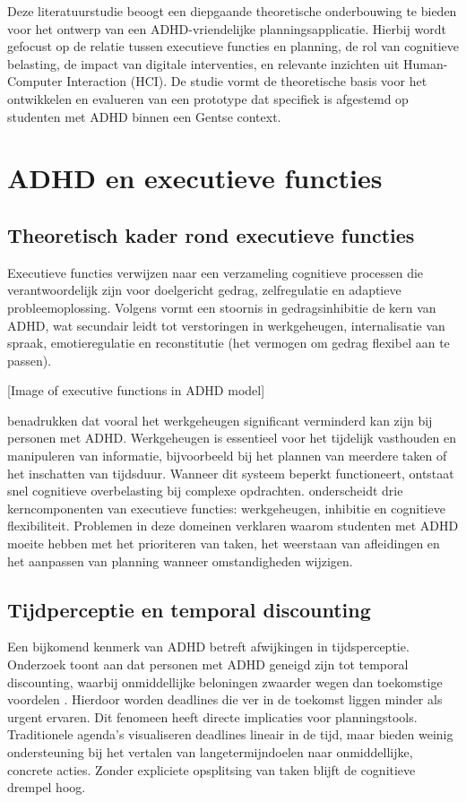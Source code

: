 Deze literatuurstudie beoogt een diepgaande theoretische onderbouwing te bieden voor het ontwerp van een ADHD-vriendelijke planningsapplicatie. Hierbij wordt gefocust op de relatie tussen executieve functies en planning, de rol van cognitieve belasting, de impact van digitale interventies, en relevante inzichten uit Human-Computer Interaction (HCI). De studie vormt de theoretische basis voor het ontwikkelen en evalueren van een prototype dat specifiek is afgestemd op studenten met ADHD binnen een Gentse context.

\section{ADHD en executieve functies}
\subsection{Theoretisch kader rond executieve functies}
Executieve functies verwijzen naar een verzameling cognitieve processen die verantwoordelijk zijn voor doelgericht gedrag, zelfregulatie en adaptieve probleemoplossing. Volgens \textcite{Barkley2015} vormt een stoornis in gedragsinhibitie de kern van ADHD, wat secundair leidt tot verstoringen in werkgeheugen, internalisatie van spraak, emotieregulatie en reconstitutie (het vermogen om gedrag flexibel aan te passen).



[Image of executive functions in ADHD model]


\textcite{Alloway2010} benadrukken dat vooral het werkgeheugen significant verminderd kan zijn bij personen met ADHD. Werkgeheugen is essentieel voor het tijdelijk vasthouden en manipuleren van informatie, bijvoorbeeld bij het plannen van meerdere taken of het inschatten van tijdsduur. Wanneer dit systeem beperkt functioneert, ontstaat snel cognitieve overbelasting bij complexe opdrachten. \textcite{Diamond2013} onderscheidt drie kerncomponenten van executieve functies: werkgeheugen, inhibitie en cognitieve flexibiliteit. Problemen in deze domeinen verklaren waarom studenten met ADHD moeite hebben met het prioriteren van taken, het weerstaan van afleidingen en het aanpassen van planning wanneer omstandigheden wijzigen.

\subsection{Tijdperceptie en temporal discounting}
Een bijkomend kenmerk van ADHD betreft afwijkingen in tijdsperceptie. Onderzoek toont aan dat personen met ADHD geneigd zijn tot temporal discounting, waarbij onmiddellijke beloningen zwaarder wegen dan toekomstige voordelen \autocite{Sonuga-Barke2010}. Hierdoor worden deadlines die ver in de toekomst liggen minder als urgent ervaren. Dit fenomeen heeft directe implicaties voor planningstools. Traditionele agenda's visualiseren deadlines lineair in de tijd, maar bieden weinig ondersteuning bij het vertalen van langetermijndoelen naar onmiddellijke, concrete acties. Zonder expliciete opsplitsing van taken blijft de cognitieve drempel hoog.

